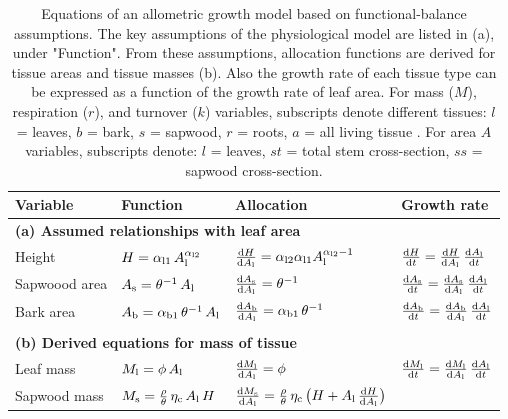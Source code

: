 \documentclass[10pt,twoside]{article}
\begin{document}
\newpage

\begin{table}[h!]
\caption{Equations of an allometric growth model based on functional-balance assumptions.
The key assumptions of the physiological model are listed in (a), under "Function". From these
assumptions, allocation functions are derived for tissue areas and tissue masses (b). Also
the growth rate of each tissue type can be expressed as a function of the growth rate of leaf area. For mass ($M$), respiration ($r$), and turnover ($k$)
variables, subscripts denote different tissues: \(l\) = leaves, \(b\) = bark, \(s\) = sapwood,
\(r\) = roots, \(a\) = all living tissue  . For area \(A\) variables, subscripts denote: \(l\) = leaves, \(st\) = total stem cross-section, \(ss\) = sapwood cross-section.}
\centering
\begin{tabular}{p{2.5cm}p{3.5cm}p{5cm}p{4cm} }\\ \hline
Variable & Function & Allocation & Growth rate\\ \hline
\multicolumn{4}{l}{\textbf{(a) Assumed relationships with leaf area}} \\
Height &
$H = \alpha_{{\rm l1}} \, A_{\rm l  }^{\alpha_{{\rm l2}}}$ &
$\frac{{\rm d}H}{{\rm d}A_{\rm l}} = \alpha_{{\rm l2}} \alpha_{{\rm l1}} A_{\rm l}^{\alpha_{{\rm l2}}-1}$ &
$\frac{{\rm d}H}{{\rm d}t} = \frac{{\rm d}H}{{\rm d}A_{\rm l}} \, \frac{{\rm d}A_{\rm l}}{{\rm d}t}$ \\
Sapwoood area &
$A_{\rm s} = \theta^{-1} \, A_{\rm l}$ &
$\frac{{\rm d}A_{\rm s}}{{\rm d} A_{\rm l}} = \theta^{-1}$ &
$\frac{{\rm d}A_{\rm s}}{{\rm d}t} = \frac{{\rm d}A_{\rm s}}{{\rm d} A_{\rm l}} \, \frac{{\rm d}A_{\rm l}}{{\rm d}t}$ \\
Bark area &
$A_{\rm b} = \alpha_{{\rm b1}} \, \theta^{-1} \, A_{\rm l}$ &
$\frac{{\rm d}A_{\rm b}}{{\rm d} A_{\rm l}} = \alpha_{{\rm b1}} \, \theta^{-1}$ &
$\frac{{\rm d}A_{\rm b}}{{\rm d}t} = \frac{{\rm d}A_{\rm b}}{{\rm d} A_{\rm l}} \, \frac{{\rm d}A_{\rm l}}{{\rm d}t}$ \\ \\
\multicolumn{4}{l}{\textbf{(b) Derived equations for mass of tissue }} \\
Leaf mass &
$M_{\rm l} = \phi \, A_{\rm l} $ &
$\frac{{\rm d}M_{\rm l}}{{\rm d}A_{\rm l}} = \phi$ &
$\frac{{\rm d}M_{\rm l}}{{\rm d}t} = \frac{{\rm d}M_{\rm l}}{{\rm d}A_{\rm l}} \, \frac{{\rm d}A_{\rm l}}{{\rm d}t}$ \\
Sapwood mass &
$M_{\rm s} = \frac{\rho}{\theta} \, \eta_{\rm c} \, A_{\rm l} \, H $ &
$\frac{{\rm d}M_{\rm s}}{{\rm d}A_{\rm l}} = \frac{\rho}{\theta} \, \eta_{\rm c} \, \big(H + A_{\rm l} \, \frac{{\rm d}H}{{\rm d}A_{\rm l}} \big)$ &

\end{tabular}
\end{table}
\end{document}
